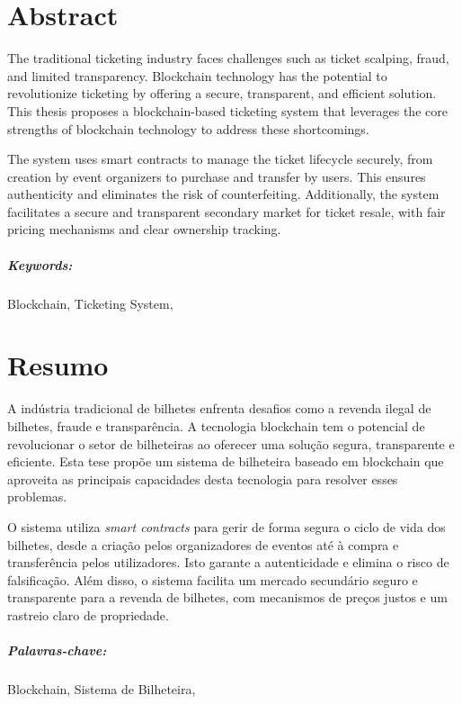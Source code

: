 \chapter*{Abstract}

The traditional ticketing industry faces challenges such as ticket scalping,
fraud, and limited transparency. Blockchain technology has the potential to
revolutionize ticketing by offering a secure, transparent, and efficient
solution. This thesis proposes a blockchain-based ticketing system that
leverages the core strengths of blockchain technology to address these
shortcomings.

The system uses smart contracts to manage the ticket lifecycle securely, from
creation by event organizers to purchase and transfer by users. This ensures
authenticity and eliminates the risk of counterfeiting. Additionally, the
system facilitates a secure and transparent secondary market for ticket resale,
with fair pricing mechanisms and clear ownership tracking.

\paragraph{Keywords:} Blockchain, Ticketing System, 

\chapter*{Resumo}

A indústria tradicional de bilhetes enfrenta desafios como a revenda ilegal de
bilhetes, fraude e transparência. A tecnologia blockchain tem o potencial de
revolucionar o setor de bilheteiras ao oferecer uma solução segura,
transparente e eficiente. Esta tese propõe um sistema de bilheteira baseado em
blockchain que aproveita as principais capacidades desta tecnologia para
resolver esses problemas.

O sistema utiliza \textit{smart contracts} para gerir de forma segura o ciclo
de vida dos bilhetes, desde a criação pelos organizadores de eventos até à
compra e transferência pelos utilizadores. Isto garante a autenticidade e
elimina o risco de falsificação. Além disso, o sistema facilita um mercado
secundário seguro e transparente para a revenda de bilhetes, com mecanismos de
preços justos e um rastreio claro de propriedade.

\paragraph{Palavras-chave:} Blockchain, Sistema de Bilheteira, 
